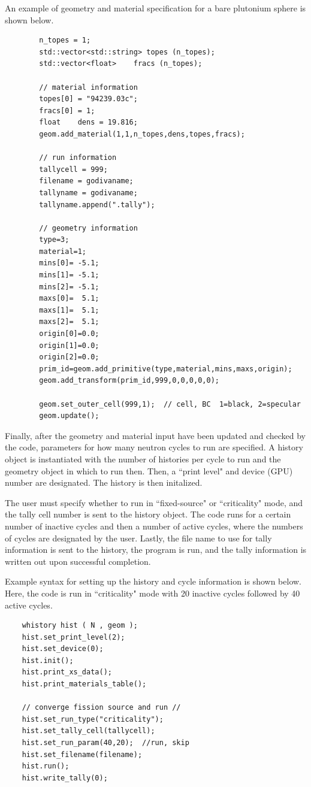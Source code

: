 \documentclass[twoside,a4paper]{refart}
\begin{document}
An example of geometry and material specification for a bare plutonium sphere is shown below.

\begin{verbatim}
		n_topes = 1;
		std::vector<std::string> topes (n_topes);
		std::vector<float>    fracs (n_topes);

		// material information
		topes[0] = "94239.03c";
		fracs[0] = 1;      
		float    dens = 19.816;
		geom.add_material(1,1,n_topes,dens,topes,fracs);
		
		// run information
		tallycell = 999;
		filename = godivaname;
		tallyname = godivaname;
		tallyname.append(".tally");
	
		// geometry information
		type=3;
		material=1;
		mins[0]= -5.1;
		mins[1]= -5.1;
		mins[2]= -5.1;
		maxs[0]=  5.1;
		maxs[1]=  5.1;
		maxs[2]=  5.1;
		origin[0]=0.0;
		origin[1]=0.0;
		origin[2]=0.0;
		prim_id=geom.add_primitive(type,material,mins,maxs,origin);
		geom.add_transform(prim_id,999,0,0,0,0,0);

		geom.set_outer_cell(999,1);  // cell, BC  1=black, 2=specular
		geom.update();
\end{verbatim}

Finally, after the geometry and material input have been updated and checked by the code, parameters for how many neutron cycles to run are specified. A history object is instantiated with the number of
histories per cycle to run and the geometry object in which to run then. Then, a ``print level" and 
device (GPU) number are designated. The history is then initalized.

The user must specify whether to run in ``fixed-source" or ``criticality" mode, and the tally cell number
is sent to the history object. The code runs for a certain number of inactive cycles and then a number of
active cycles, where the numbers of cycles are designated by the user. Lastly, the file name to use for
tally information is sent to the history, the program is run, and the tally information is written out
upon successful completion.

Example syntax for setting up the history and cycle information is shown below. Here, the code is run in
``criticality" mode with 20 inactive cycles followed by 40 active cycles.

\begin{verbatim}
	whistory hist ( N , geom );
	hist.set_print_level(2);
	hist.set_device(0);
	hist.init();
	hist.print_xs_data();
	hist.print_materials_table();

	// converge fission source and run //
	hist.set_run_type("criticality");
	hist.set_tally_cell(tallycell);
	hist.set_run_param(40,20);  //run, skip
	hist.set_filename(filename);
	hist.run();
	hist.write_tally(0);
\end{verbatim}
\end{document}
